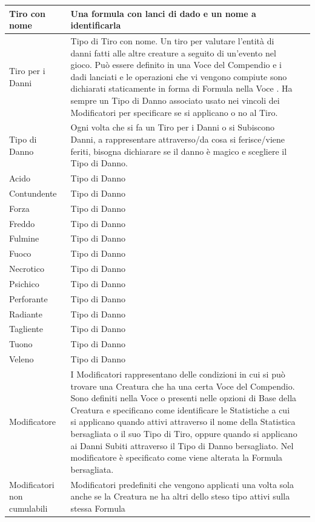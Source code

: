 \documentclass[a4paper, 11pt]{article}
\begin{document}
\begin{center}
\begin{longtable}{ |p{3.5cm}|p{9cm}|p{3cm}|  }
    Tiro con nome & Una formula con lanci di dado e un nome a identificarla & \\\hline
    Tiro per i Danni & Tipo di Tiro con nome. Un tiro per valutare l’entità di danni fatti alle altre creature a seguito di un’evento nel gioco. Può essere definito in una Voce del Compendio e i dadi lanciati e le operazioni che vi vengono compiute sono dichiarati staticamente in forma di Formula nella Voce . Ha sempre un Tipo di Danno associato usato nei vincoli dei Modificatori per specificare se si applicano o no al Tiro. & \\\hline
    Tipo di Danno & Ogni volta che si fa un Tiro per i Danni o si Subiscono Danni, a rappresentare attraverso/da cosa si ferisce/viene feriti, bisogna dichiarare se il danno è magico e scegliere il Tipo di Danno. & \\\hline
    Acido & Tipo di Danno & \\\hline
    Contundente & Tipo di Danno & \\\hline
    Forza & Tipo di Danno & \\\hline
    Freddo & Tipo di Danno & \\\hline
    Fulmine & Tipo di Danno & \\\hline
    Fuoco & Tipo di Danno & \\\hline
    Necrotico & Tipo di Danno & \\\hline
    Psichico & Tipo di Danno & \\\hline
    Perforante & Tipo di Danno & \\\hline
    Radiante & Tipo di Danno & \\\hline
    Tagliente & Tipo di Danno & \\\hline
    Tuono & Tipo di Danno & \\\hline
    Veleno & Tipo di Danno & \\\hline
    Modificatore & I Modificatori rappresentano delle condizioni in cui si può trovare una Creatura che ha una certa Voce del Compendio. Sono definiti nella Voce o presenti nelle opzioni di Base della Creatura e specificano come identificare le Statistiche a cui si applicano quando attivi attraverso il nome della Statistica bersagliata o il suo Tipo di Tiro, oppure quando si applicano ai Danni Subiti attraverso il Tipo di Danno bersagliato. Nel modificatore è specificato come viene alterata la Formula bersagliata. & \\\hline
    Modificatori non cumulabili & Modificatori predefiniti che vengono applicati una volta sola anche se la Creatura ne ha altri dello steso tipo attivi sulla stessa Formula &\\\hline

\end{longtable}
\end{center}
\end{document}
